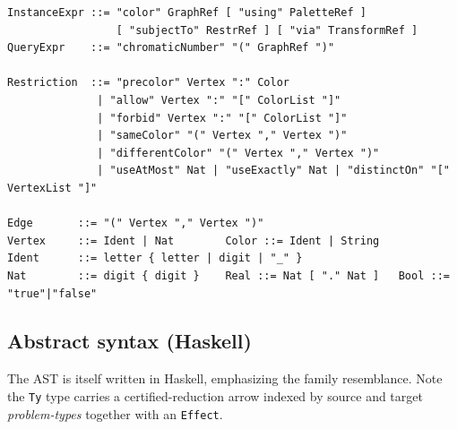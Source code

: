 \documentclass[11pt]{article}
\theoremstyle{definition}
\theoremstyle{remark}
\begin{document}
\begin{lstlisting}[style=lang]
InstanceExpr ::= "color" GraphRef [ "using" PaletteRef ]
                 [ "subjectTo" RestrRef ] [ "via" TransformRef ]
QueryExpr    ::= "chromaticNumber" "(" GraphRef ")"

Restriction  ::= "precolor" Vertex ":" Color
              | "allow" Vertex ":" "[" ColorList "]"
              | "forbid" Vertex ":" "[" ColorList "]"
              | "sameColor" "(" Vertex "," Vertex ")"
              | "differentColor" "(" Vertex "," Vertex ")"
              | "useAtMost" Nat | "useExactly" Nat | "distinctOn" "[" VertexList "]"

Edge       ::= "(" Vertex "," Vertex ")"
Vertex     ::= Ident | Nat        Color ::= Ident | String
Ident      ::= letter { letter | digit | "_" }
Nat        ::= digit { digit }    Real ::= Nat [ "." Nat ]   Bool ::= "true"|"false"
\end{lstlisting}

\subsection{Abstract syntax (Haskell)}
\label{sec:ast}

The AST is itself written in Haskell, emphasizing the family resemblance. Note the
\texttt{Ty} type carries a certified-reduction arrow indexed by source and target
\emph{problem-types} together with an \texttt{Effect}.
\end{document}
